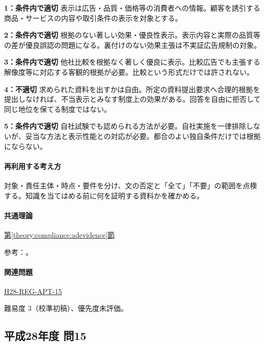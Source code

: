 \noindent\textbf{1：条件内で適切} 表示は広告・品質・価格等の消費者への情報。顧客を誘引する商品・サービスの内容や取引条件の表示を対象とする。\par

\noindent\textbf{2：条件内で適切} 根拠のない著しい効果・優良性表示。表示内容と実際の品質等の差が優良誤認の問題になる。裏付けのない効果主張は不実証広告規制の対象。\par

\noindent\textbf{3：条件内で適切} 他社比較を根拠なく著しく優良に表示。比較広告でも主張する解像度等に対応する客観的根拠が必要。比較という形式だけでは許されない。\par

\noindent\textbf{4：不適切} 求められた資料を出すかは自由。所定の資料提出要求へ合理的根拠を提出しなければ、不当表示とみなす制度上の効果がある。回答を自由に拒否して同じ地位を保てる制度ではない。\par

\noindent\textbf{5：条件内で適切} 自社試験でも認められる方法が必要。自社実施を一律排除しないが、妥当な方法と表示性能との対応が必要。都合のよい独自条件だけでは根拠にならない。\par

\paragraph{再利用する考え方} 対象・責任主体・時点・要件を分け、文の否定と「全て」「不要」の範囲を点検する。知識を当てはめる前に何を証明する資料かを確かめる。

\paragraph{共通理論} \hyperref[theory:compliance:adevidence]{第\ref*{theory:compliance:adevidence}節}

\par 参考：\cite{saf53_ad2016,saf53_ad_overview}。

\paragraph{関連問題} \hyperref[q:h28-reg-apt-15]{H28-REG-APT-15}

\par 難易度 3（校準初稿）、優先度未評価。

\subsection{平成28年度 問15}
\label{q:h28-reg-apt-15}

